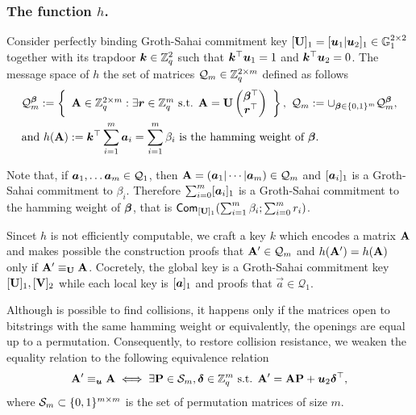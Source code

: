 
\subsubsection{The function $h$.} Consider perfectly binding Groth-Sahai commitment key $[\mathbf{{U}}]_1 = [{\boldsymbol{u}}_1|{\boldsymbol{u}}_2]_1\in\mathbb{G}_1^{2\times 2}$ together with its trapdoor ${\boldsymbol{k}}\in\mathbb{Z}_q^2$ such that ${\boldsymbol{k}}^\top{\boldsymbol{u}}_1 = 1$ and ${\boldsymbol{k}}^\top{\boldsymbol{u}}_2 = 0$. The message space of $h$ the set of matrices $\mathcal{Q}_m\in\mathbb{Z}_q^{2\times m}$ defined as follows
\begin{align*}
&\mathcal{Q}_m^{\boldsymbol{\beta}} := \left\{
\begin{array}{c}
\mathbf{{A}} \in \mathbb{Z}_q^{2\times m}:
\exists {\boldsymbol{r}}\in\mathbb{Z}_q^m\text{ s.t. }
{\mathbf{{A}} = \mathbf{{U}}\left(\begin{matrix}{\boldsymbol{\beta}}^\top\\{\boldsymbol{r}}^\top\end{matrix}\right)
}
\end{array}\right\},
\ \mathcal{Q}_m := \cup_{{\boldsymbol{\beta}}\in\{0,1\}^m} \mathcal{Q}_m^{\boldsymbol{\beta}},\\
&\text{and } h(\mathbf{{A}}):= {\boldsymbol{k}}^\top\sum_{i=1}^m{\boldsymbol{a}}_i = \sum_{i=1}^m \beta_i \text{ is the hamming weight of }{\boldsymbol{\beta}}.
\end{align*}

Note that, if ${\boldsymbol{a}}_1,\ldots {\boldsymbol{a}}_m\in\mathcal{Q}_{1}$, then $\matr{A} = (\vec{a}_1\cat\cdots\cat\vecb{a}_m)\in\mathcal{Q}_{m}$ and $[{\boldsymbol{a}}_i]_1$ is a Groth-Sahai commitment to $\beta_i$.
Therefore $\sum_{i=0}^m[{\boldsymbol{a}}_i]_1$ is a Groth-Sahai commitment to the hamming weight of ${\boldsymbol{\beta}}$, that is $\mathsf{Com}_{[\mathbf{{U}}]_1}(\sum_{i=1}^m \beta_i;\sum_{i=0}^m r_i)$.

Sincet $h$ is not efficiently computable, we craft a key $k$ which encodes a matrix $\mathbf{{A}}$ and makes possible the construction proofs that $\mathbf{{A}}'\in\mathcal{Q}_m$ and $h(\mathbf{{A}}')=h(\mathbf{{A}})$ only if $\mathbf{{A}}'\equiv_{\mathbf{{U}}}\mathbf{{A}}$. Cocretely, the global key is a Groth-Sahai commitment key $[\mathbf{{U}}]_1,[\mathbf{{V}}]_2$ while each local key is $[{\boldsymbol{a}}]_1$ and proofs that $\vec{a}\in\mathcal{Q}_1$.

Although is possible to find collisions, it happens only if the matrices open to bitstrings with the same hamming weight or equivalently, the openings are equal up to a permutation. Consequently, to restore collision resistance, we weaken the equality relation to the following equivalence relation
$$
\mathbf{{A}}' \equiv_{\boldsymbol{u}} \mathbf{{A}} \iff \exists \mathbf{{P}}\in\mathcal{S}_m, {\boldsymbol{\delta}}\in\mathbb{Z}_q^m \text{ s.t. } \mathbf{{A}}' = \mathbf{{A}}\mathbf{{P}} + {\boldsymbol{u}}_2{\boldsymbol{\delta}}^\top,
$$
where $\mathcal{S}_m\subset \{0,1\}^{m\times m}$ is the set of permutation matrices of size $m$.

